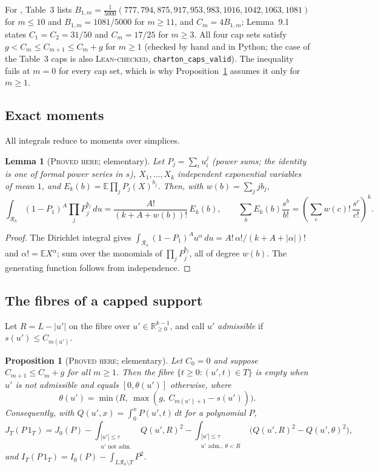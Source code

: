 \documentclass[11pt]{amsart}
\newtheorem{proposition}[theorem]{Proposition}
\newtheorem{lemma}[theorem]{Lemma}
\theoremstyle{definition}
\theoremstyle{remark}
\newcommand{\lbl}[1]{\textup{\textsc{#1}}}
\newcommand{\R}{\mathcal{R}}
\begin{document}
For \cite{Cha26}, Table~3 lists
$B_{1,m}=\frac1{5000}(777,794,875,917,953,983,1016,1042,1063,1081)$ for
$m\le10$ and $B_{1,m}=1081/5000$ for $m\ge11$, and $C_m=4B_{1,m}$; Lemma~9.1
states $C_1=C_2=31/50$ and $C_m=17/25$ for $m\ge3$. All four cap sets satisfy
$g<C_m\le C_{m+1}\le C_m+g$ for $m\ge1$ (checked by hand and in Python; the
case of the Table~3 caps is also \lbl{Lean-checked}, \texttt{charton\_caps\_valid}).
The inequality fails at $m=0$ for every cap set, which is why
Proposition~\ref{prop:fibre} assumes it only for $m\ge1$.

\subsection*{Exact moments}
All integrals reduce to moments over simplices.

\begin{lemma}[\lbl{Proved here}; elementary]\label{lem:egf}
Let $P_j=\sum_iu_i^j$ (power sums; the identity is one of formal power
series in $s$), $X_1,\dots,X_k$ independent exponential variables of
mean $1$, and $E_k(b)=\mathbb E\prod_jP_j(X)^{b_j}$. Then, with
$w(b)=\sum_jjb_j$,
\[
\int_{\R_k}(1-P_1)^A\prod_jP_j^{b_j}\,du=\frac{A!}{(k+A+w(b))!}\,E_k(b),
\qquad
\sum_bE_k(b)\frac{s^b}{b!}=\left(\sum_c w(c)!\,\frac{s^c}{c!}\right)^{k}.
\]
\end{lemma}

\begin{proof}
The Dirichlet integral gives $\int_{\R_k}(1-P_1)^Au^\alpha\,du=A!\,\alpha!/(k+A+|\alpha|)!$
and $\alpha!=\mathbb EX^\alpha$; sum over the monomials of $\prod_jP_j^{b_j}$,
all of degree $w(b)$. The generating function follows from independence.
\end{proof}

\subsection*{The fibres of a capped support}
Let $R=L-|u'|$ on the fibre over $u'\in\mathbb R^{k-1}_{\ge0}$, and call $u'$
\emph{admissible} if $s(u')\le C_{m(u')}$.

\begin{proposition}[\lbl{Proved here}; elementary]\label{prop:fibre}
Let $C_0=0$ and suppose $C_{m+1}\le C_m+g$ for all $m\ge1$. Then the fibre
$\{t\ge0:(u',t)\in T\}$ is empty when $u'$ is not admissible and equals
$[0,\theta(u')]$ otherwise, where
\[
\theta(u')=\min\bigl(R,\ \max(g,\ C_{m(u')+1}-s(u'))\bigr).
\]
Consequently, with $Q(u',x)=\int_0^xP(u',t)\,dt$ for a polynomial $P$,
\[
J_T(P\,1_T)=J_0(P)-\int_{\substack{|u'|\le\tau\\ u'\text{ not adm.}}}Q(u',R)^2
-\int_{\substack{|u'|\le\tau\\ u'\text{ adm.},\ \theta<R}}\bigl(Q(u',R)^2-Q(u',\theta)^2\bigr),
\]
and $I_T(P\,1_T)=I_0(P)-\int_{L\R_k\setminus T}P^2$.
\end{proposition}
\end{document}

